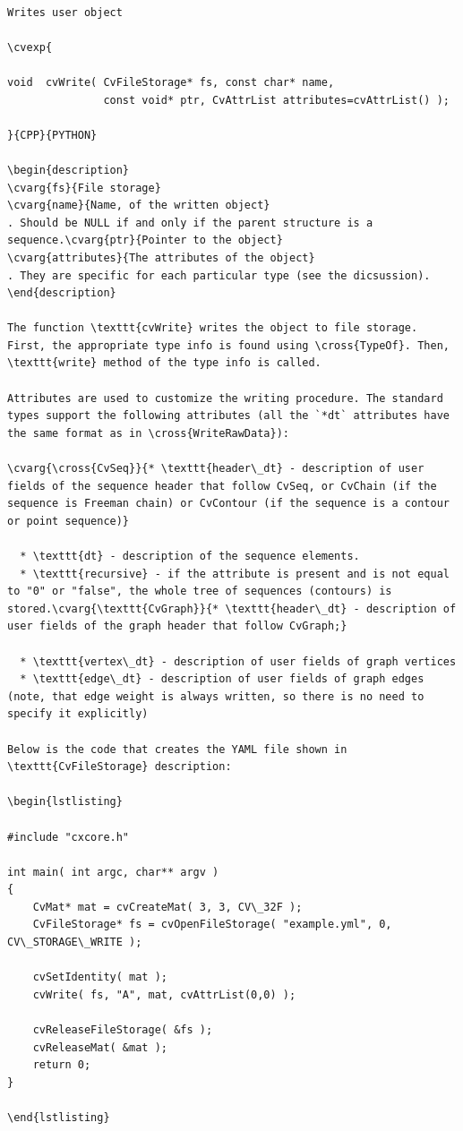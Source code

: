 \begin{verbatim}

Writes user object

\cvexp{

void  cvWrite( CvFileStorage* fs, const char* name,
               const void* ptr, CvAttrList attributes=cvAttrList() );

}{CPP}{PYTHON}

\begin{description}
\cvarg{fs}{File storage}
\cvarg{name}{Name, of the written object}
. Should be NULL if and only if the parent structure is a sequence.\cvarg{ptr}{Pointer to the object}
\cvarg{attributes}{The attributes of the object}
. They are specific for each particular type (see the dicsussion).
\end{description}

The function \texttt{cvWrite} writes the object to file storage. First, the appropriate type info is found using \cross{TypeOf}. Then, \texttt{write} method of the type info is called.

Attributes are used to customize the writing procedure. The standard types support the following attributes (all the `*dt` attributes have the same format as in \cross{WriteRawData}):

\cvarg{\cross{CvSeq}}{* \texttt{header\_dt} - description of user fields of the sequence header that follow CvSeq, or CvChain (if the sequence is Freeman chain) or CvContour (if the sequence is a contour or point sequence)}

  * \texttt{dt} - description of the sequence elements.
  * \texttt{recursive} - if the attribute is present and is not equal to "0" or "false", the whole tree of sequences (contours) is stored.\cvarg{\texttt{CvGraph}}{* \texttt{header\_dt} - description of user fields of the graph header that follow CvGraph;}

  * \texttt{vertex\_dt} - description of user fields of graph vertices
  * \texttt{edge\_dt} - description of user fields of graph edges (note, that edge weight is always written, so there is no need to specify it explicitly)

Below is the code that creates the YAML file shown in \texttt{CvFileStorage} description:

\begin{lstlisting}

#include "cxcore.h"

int main( int argc, char** argv )
{
    CvMat* mat = cvCreateMat( 3, 3, CV\_32F );
    CvFileStorage* fs = cvOpenFileStorage( "example.yml", 0, CV\_STORAGE\_WRITE );

    cvSetIdentity( mat );
    cvWrite( fs, "A", mat, cvAttrList(0,0) );

    cvReleaseFileStorage( &fs );
    cvReleaseMat( &mat );
    return 0;
}

\end{lstlisting}


\end{verbatim}
